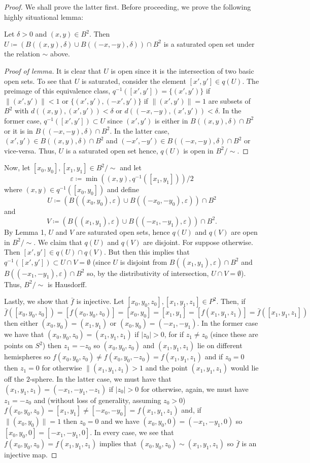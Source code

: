 \begin{proof}
We shall prove the latter first. Before proceeding, we prove the following
highly situational lemma:
\begin{lemma}
Let $\delta>0$ and $(x,y)\in B^2$. Then $U\coloneqq(B((x,y),\delta)\cup
B((-x,-y),\delta))\cap B^2$ is a saturated open set under the relation
$\sim$ above.
\end{lemma}
\begin{proof}[Proof of lemma]
\renewcommand\qedsymbol{$\clubsuit$}
It is clear that $U$ is open since it is the intersection of two basic open
sets. To see that $U$ is saturated, consider the element $[x',y']\in
q(U)$. The preimage of this equivalence class,
$q^{-1}([x',y'])=\{(x',y')\}$ if $\|(x',y')\|<1$ or
$\{(x',y'),(-x',y')\}$ if $\|(x',y')\|=1$ are subsets of $B^2$ with
$d((x,y),(x',y'))<\delta$ or $d((-x,-y),(x',y'))<\delta$. In the former
case, $q^{-1}([x',y'])\subset U$ since $(x',y')$ is either in
$B((x,y),\delta)\cap B^2$ or it is in $B((-x,-y),\delta)\cap B^2$. In the
latter case, $(x',y')\in B((x,y),\delta)\cap B^2$ and $(-x',-y')\in
B((-x,-y),\delta)\cap B^2$ or vice-versa. Thus, $U$ is a saturated open set
hence, $q(U)$ is open in $B^2/{\sim}$.
\end{proof}
Now, let $[x_0,y_0],[x_1,y_1]\in
B^2/{\sim}$ and let
\[
\varepsilon\coloneqq\min\left((x,y),q^{-1}([x_1,y_1])\right)/2
\]
where $(x,y)\in q^{-1}([x_0,y_0])$ and define
\[
U\coloneqq(B((x_0,y_0),\varepsilon)\cup B((-x_0,-y_0),\varepsilon))\cap B^2
\]
and
\[
V\coloneqq(B((x_1,y_1),\varepsilon)\cup B((-x_1,-y_1),\varepsilon))\cap B^2.
\]
By Lemma 1, $U$ and $V$ are saturated open sets, hence $q(U)$ and $q(V)$
are open in $B^2/{\sim}$. We claim that $q(U)$ and $q(V)$ are disjoint. For
suppose otherwise. Then $[x',y']\in q(U)\cap q(V)$. But then this implies
that $q^{-1}([x',y'])\subset U\cap V=\emptyset$ (since $U$ is disjoint from
$B((x_1,y_1),\varepsilon)\cap B^2$ and $B((-x_1,-y_1),\varepsilon)\cap
B^2$ so, by the distributivity of intersection, $U\cap V=\emptyset$). Thus,
$B^2/{\sim}$ is Hausdorff.

Lastly, we show that $\bar f$ is injective. Let
$[x_0,y_0,z_0],[x_1,y_1,z_1]\in P^2$. Then, if
\[
\bar
f([x_0,y_0,z_0])=[f(x_0,y_0,z_0)]=[x_0,y_0]=[x_1,y_1]=[f(x_1,y_1,z_1)]=\bar
f([x_1,y_1,z_1])
\]
then either $(x_0,y_0)=(x_1,y_1)$ or $(x_0,y_0)=(-x_1,-y_1)$. In the former
case we have that $(x_0,y_0,z_0)=(x_1,y_1,z_1)$ if $|z_0|>0$, for if $z_1\neq
z_0$ (since these are points on $S^2$) then $z_1=-z_0$ so $(x_0,y_0,z_0)$
and $(x_1,y_1,z_1)$ lie on different hemispheres so $f(x_0,y_0,z_0)\neq
f(x_0,y_0,-z_0)=f(x_1,y_1,z_1)$ and if $z_0=0$ then $z_1=0$ for otherwise
$\|(x_1,y_1,z_1)>1$ and the point $(x_1,y_1,z_1)$ would lie off the
$2$-sphere. In the latter case, we must have that
$(x_1,y_1,z_1)=(-x_1,-y_1,-z_1)$ if $|z_0|>0$ for otherwise, again, we must
have $z_1=-z_0$ and (without loss of generality, assuming $z_0>0$)
$f(x_0,y_0,z_0)=[x_1,y_1]\neq[-x_0,-y_0]=f(x_1,y_1,z_1)$ and, if
$\|(x_0,y_0)\|=1$ then $z_0=0$ and we have $(x_0,y_0,0)=(-x_1,-y_1,0)$ so
$[x_0,y_0,0]=[-x_1,-y_1,0]$. In every case, we see that
$f(x_0,y_0,z_0)=f(x_1,y_1,z_1)$ implies that
$(x_0,y_0,z_0)\sim(x_1,y_1,z_1)$ so $\bar f$ is an injective map.


\end{proof}
